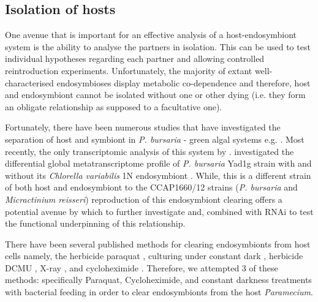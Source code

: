 %

\subsection{Isolation of hosts}

One avenue that is important for an effective analysis of a host-endosymbiont
system is the ability to analyse the partners in isolation.  This can be used
to test individual hypotheses regarding each partner and allowing controlled
reintroduction experiments. 
Unfortunately,
the majority of extant well-characterised endosymbioses display metabolic co-dependence
and therefore, host and endosymbiont cannot be isolated without one or other dying (i.e. they
form an obligate relationship as supposed to a facultative one). 

Fortunately, there have been numerous studies that have investigated the separation of 
host and symbiont in \textit{P. bursaria} - green algal systems e.g. \citep{Hosoya1995a,Achilles-Day2013,
Karakashian1963}. Most recently, the only transcriptomic analysis of this system by \citep{Kodama2014c}.
investigated the differential global metatranscriptome profile of \textit{P. bursaria} Yad1g strain with 
 and without its \textit{Chlorella variabilis} 1N endosymbiont 
\citep{Kodama2014c}.   While, this is a different strain of both host and endosymbiont to the CCAP1660/12 
strains (\textit{P. bursaria} and \textit{Micractinium reisseri}) reproduction of this endosymbiont
clearing offers a potential avenue by which to further investigate and, combined with RNAi 
to test the functional underpinning of this relationship. 

There have been several published methods
for clearing endosymbionts from host cells namely, the herbicide paraquat \citep{Hosoya1995a}, 
culturing under constant dark \citep{Karakashian1963}, herbicide DCMU \citep{Kodama2009a},
X-ray \citep{Wichterman1948}, and cycloheximide \citep{weis1984effect,Kodama2007}.
Therefore, we attempted 3 of these methods: specifically Paraquat, Cycloheximide, and 
constant darkness treatments with bacterial feeding 
in order to clear endosymbionts from the host \textit{Paramecium}.

